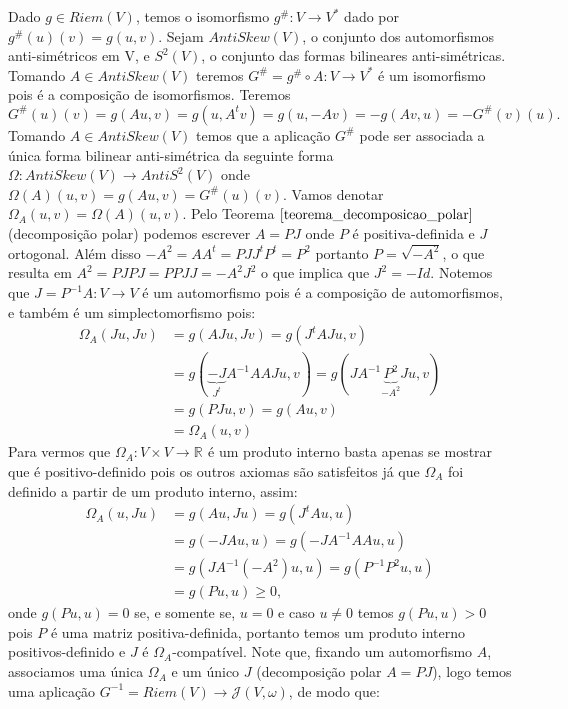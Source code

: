 \documentclass[12pt]{book}
\newcommand{\estruturacomplexapadrao}{\mathcal{J}(V, \omega)}
\newcommand{\matrizantisimetrica}[1]{AntiSkew(#1)}
\newcommand{\produtosinternos}[1]{Riem(#1)}
\newcommand{\real}[1]{\mathbb{R}^{#1}}
\newcommand{\vermelho}[1]{{\color{red}#1}}
\begin{document}
	Dado $g \in \produtosinternos{V}$, temos o isomorfismo $g^{\#}:V \to V^{*}$ dado por $g^{\#}(u)(v) = g(u,v)$. Sejam $\matrizantisimetrica{V}$, o conjunto dos automorfismos anti-simétricos em V, e $S^{2}(V)$, o conjunto das formas bilineares anti-simétricas. Tomando $A \in \matrizantisimetrica{V}$ teremos $G^{\#} = g^{\#}\circ A:V\to V^{*}$ é um isomorfismo pois é a composição de isomorfismos. Teremos 
	$$
	G^{\#}(u)(v)=g(Au,v) = g(u,A^{t}v) = g(u,-Av) = -g(Av,u) = -G^{\#}(v)(u).
	$$
	Tomando $A\in \matrizantisimetrica{V}$ temos que a aplicação $G^{\#}$ pode ser associada a única forma bilinear anti-simétrica da seguinte forma $\Omega : \matrizantisimetrica{V} \to AntiS^{2}(V)$ onde $\Omega(A)(u,v)  = g(Au,v)= G^{\#}(u)(v)$. Vamos denotar $\Omega_{A}(u,v) = \Omega(A)(u,v)$. Pelo Teorema $\ref{teorema_decomposicao_polar}$ (decomposição polar) podemos escrever $A = PJ$ onde $P$ é positiva-definida e $J$ ortogonal. Além disso $-A^{2}=AA^{t} = PJJ^{t}P^{t} = P^{2}$ portanto $P=\sqrt{-A^{2}}$, \vermelho{o que resulta em $A^{2} = PJPJ = PPJJ = -A^{2}J^{2}$ o que implica que $J^{2} = -Id$.} Notemos que $J=P^{-1}A:V \to V$ é um automorfismo pois é a composição de automorfismos, e também é um simplectomorfismo pois:
	$$
	\begin{aligned}
		\Omega_{A}(Ju,Jv) &= g(AJu, Jv)= g(J^{t}AJu, v)
		\\
		&=g(\underbrace{-J}_{J^{t}}A^{-1}AAJu, v) = g(JA^{-1}\underbrace{P^{2}}_{-A^{2}}Ju, v)
		\\
		&=g(PJu, v) = g(Au, v)
		\\
		&=\Omega_{A}(u,v)
	\end{aligned}
	$$
	Para vermos que $\Omega_{A}:V\times V\to \real{}$ é um produto interno basta apenas se mostrar que é positivo-definido pois os outros axiomas são satisfeitos já que $\Omega_{A}$ foi definido a partir de um produto interno, assim:
	$$
	\begin{aligned}
	\Omega_{A}(u,Ju) &= g(Au, Ju)= g(J^{t}Au, u)
	\\
	&=g(-JAu, u)=g(-JA^{-1}AAu, u)
	\\
	&=g(JA^{-1}(-A^{2})u, u)=g(P^{-1}P^{2}u, u)
	\\
	&=g(Pu, u)\geq 0,
	\end{aligned}
	$$ 
	onde $g(Pu, u)=0$ se, e somente se, $u=0$ e caso $u\neq 0$ temos $g(Pu, u)>0$ pois $P$ é uma matriz positiva-definida, portanto temos um produto interno positivos-definido e $J$ é $\Omega_{A}$-compatível. Note que, fixando um automorfismo $A$, associamos uma única $\Omega_{A}$ e um único $J$ (decomposição polar $A=PJ$), logo temos uma aplicação $G^{-1} = \produtosinternos{V}\to \estruturacomplexapadrao$, de modo que:
	
\end{document}
